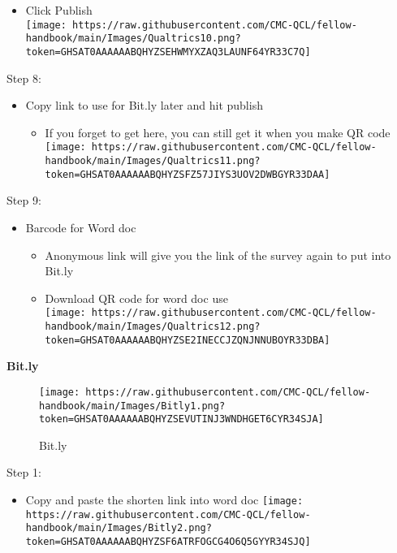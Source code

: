 \documentclass[
]{book}
\providecommand{\tightlist}{%
  \setlength{\itemsep}{0pt}\setlength{\parskip}{0pt}}
\begin{document}
\begin{itemize}
\tightlist
\item
  Click Publish\\
  \texttt{[image: https://raw.githubusercontent.com/CMC-QCL/fellow-handbook/main/Images/Qualtrics10.png?token=GHSAT0AAAAAABQHYZSEHWMYXZAQ3LAUNF64YR33C7Q]}
\end{itemize}

Step 8:

\begin{itemize}
\tightlist
\item
  Copy link to use for Bit.ly later and hit publish

  \begin{itemize}
  \tightlist
  \item
    If you forget to get here, you can still get it when you make QR code\\
    \texttt{[image: https://raw.githubusercontent.com/CMC-QCL/fellow-handbook/main/Images/Qualtrics11.png?token=GHSAT0AAAAAABQHYZSFZ57JIYS3UOV2DWBGYR33DAA]}
  \end{itemize}
\end{itemize}

Step 9:

\begin{itemize}
\tightlist
\item
  Barcode for Word doc

  \begin{itemize}
  \tightlist
  \item
    Anonymous link will give you the link of the survey again to put into Bit.ly\\
  \item
    Download QR code for word doc use\\
    \texttt{[image: https://raw.githubusercontent.com/CMC-QCL/fellow-handbook/main/Images/Qualtrics12.png?token=GHSAT0AAAAAABQHYZSE2INECCJZQNJNNUBOYR33DBA]}
  \end{itemize}
\end{itemize}

\textbf{Bit.ly}

\begin{figure}
\centering
\texttt{[image: https://raw.githubusercontent.com/CMC-QCL/fellow-handbook/main/Images/Bitly1.png?token=GHSAT0AAAAAABQHYZSEVUTINJ3WNDHGET6CYR34SJA]}
\caption{Bit.ly}
\end{figure}

Step 1:

\begin{itemize}
\tightlist
\item
  Copy and paste the shorten link into word doc
  \texttt{[image: https://raw.githubusercontent.com/CMC-QCL/fellow-handbook/main/Images/Bitly2.png?token=GHSAT0AAAAAABQHYZSF6ATRFOGCG4O6Q5GYYR34SJQ]}
\end{itemize}
\end{document}

